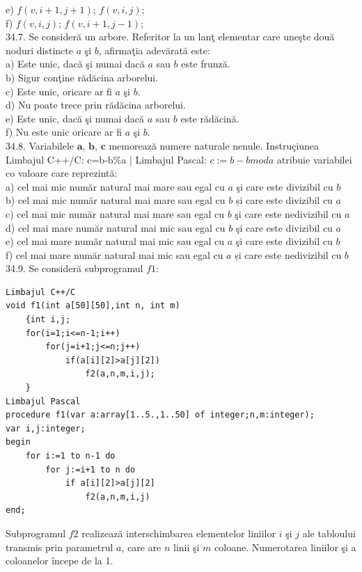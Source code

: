 \begin{itemize}
\begin{enumerate}
e) $f(v, i+1, j+1)$; $f(v, i, j)$;
\\
f) $f(v, i, j)$; $f(v, i+1, j-1)$;
\\
34.7. Se consideră un arbore. Referitor la un lanţ elementar care uneşte două noduri distincte $a$ şi $b$, afirmaţia adevărată este:
\\
a) Este unic, dacă şi numai dacă $a$ sau $b$ este frunză.
\\
b) Sigur conţine rădăcina arborelui.
\\
c) Este unic, oricare ar fi $a$ şi $b$.
\\
d) Nu poate trece prin rădăcina arborelui.
\\
e) Este unic, dacă şi numai dacă $a$ sau $b$ este rădăcină.
\\
f) Nu este unic oricare ar fi $a$ şi $b$.
\\
34.8. Variabilele $\mathbf{a}$, $\mathbf{b}$, $\mathbf{c}$ memorează numere naturale nenule.
Instruçiunea Limbajul C++/C: c=b-b\%a | Limbajul Pascal: $c:=b-b mod a$ atribuie variabilei co valoare care reprezintă:
\\
a) cel mai mic număr natural mai mare sau egal cu $a$ şi care este divizibil cu $b$
\\
b) cel mai mic număr natural mai mare sau egal cu $b$ și care este divizibil cu $a$
\\
c) cel mai mic număr natural mai mare sau egal cu $b$ şi care este nedivizibil cu $a$
\\
d) cel mai mare număr natural mai mic sau egal cu $b$ şi care este divizibil cu $a$
\\
e) cel mai mare număr natural mai mic sau egal cu $a$ şi care este divizibil cu $b$
\\
f) cel mai mare număr natural mai mic sau egal cu $a$ și care este nedivizibil cu $b$
\\
34.9. Se consideră subprogramul $f1$:
\begin{verbatim}
Limbajul C++/C
void f1(int a[50][50],int n, int m)
    {int i,j;
    for(i=1;i<=n-1;i++)
        for(j=i+1;j<=n;j++)
            if(a[i][2]>a[j][2])
                f2(a,n,m,i,j);
    }
Limbajul Pascal
procedure f1(var a:array[1..5.,1..50] of integer;n,m:integer);
var i,j:integer;
begin
    for i:=1 to n-1 do
        for j:=i+1 to n do
            if a[i][2]>a[j][2]
                f2(a,n,m,i,j)
end;
\end{verbatim}
Subprogramul $f2$ realizează interschimbarea elementelor liniilor $i$ şi $j$ ale tabloului transmis prin parametrul $a$, care are $n$ linii şi $m$ coloane. Numerotarea liniilor şi a coloanelor începe de la 1.

\end{enumerate}
\end{itemize}
